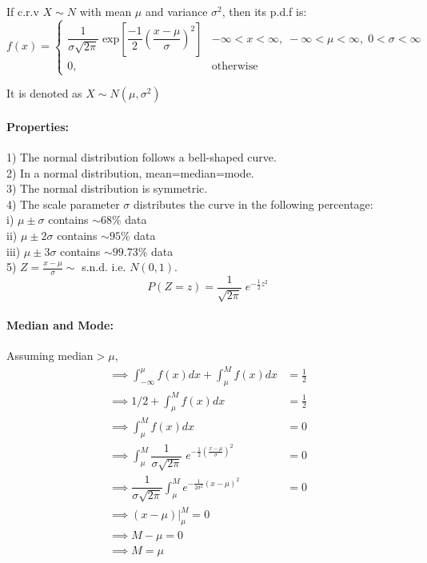 \documentclass[
10pt, %
a4paper, %
]{report}
\begin{document}
If c.r.v \(X\sim N\) with mean \(\mu\) and variance \(\sigma^2\), then its p.d.f is:
\[
    f(x)= 
\begin{cases}
    \dfrac{1}{\sigma\sqrt{2\pi}} \; \text{exp} \left[ \dfrac{-1}{2}\left( \dfrac{x-\mu}{\sigma}\right)^2\right] & {-\infty < x < \infty, \;-\infty < \mu < \infty, \;0 < \sigma < \infty} \\
    0,                                     & \text{otherwise}
\end{cases}
\]

It is denoted as \(X\sim N(\mu, \sigma^2) \)

\paragraph*{Properties:}
1) The normal distribution follows a bell-shaped curve. \\
2) In a normal distribution, mean=median=mode. \\
3) The normal distribution is symmetric. \\
4) The scale parameter \(\sigma\) distributes the curve in the following percentage: \\
i) \(\mu \pm \sigma\) contains \(\sim68\%\) data \\
ii) \(\mu \pm 2\sigma\) contains \(\sim95\%\) data \\
iii) \(\mu \pm 3\sigma\) contains \(\sim99.73\%\) data \\
5) \(Z=\frac{x-\mu}{\sigma} \sim\) s.n.d. i.e. \(N(0, 1)\).
\[
P(Z=z) = \frac{1}{\sqrt{2\pi}} \; e^{-\frac{1}{2}z^2}
\]

\paragraph*{Median and Mode:}

Assuming median\(> \mu\),
\begin{align*}
    \implies \int_{-\infty}^\mu f(x)dx + \int_\mu^M f(x)dx &= \frac{1}{2} \\
    \implies 1/2 + \int_\mu^M f(x)dx &= \frac{1}{2} \\
    \implies \int_\mu^M f(x)dx &= 0 \\
    \implies \int_\mu^M \dfrac{1}{\sigma\sqrt{2\pi}} \; e^{-\frac{1}{2}( \frac{x-\mu}{\sigma})^2} &= 0 \\
    \implies \dfrac{1}{\sigma\sqrt{2\pi}} \int_\mu^M e^{-\frac{1}{2\sigma^2}(x-\mu)^2} &= 0 \\
    \implies (x-\mu) \big|_\mu^M = 0 \\
    \implies M - \mu = 0 \\
    \implies M = \mu
\end{align*}
\end{document}
